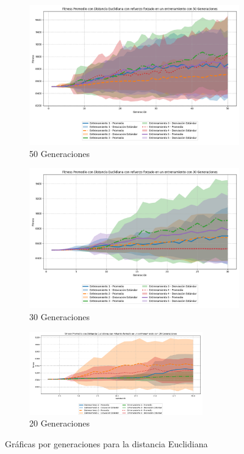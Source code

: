 \documentclass[conference]{IEEEtran}
\begin{document}
\begin{figure}[ht]
    \centering
    \begin{subfigure}{0.3\textwidth}
        \centering
        \includegraphics[width=\textwidth]{Euclidiana/Fitness_Acumulado_Eucli_50Gen.png}
        \caption{50 Generaciones}
        \label{fig:eucli_50gen}
    \end{subfigure}
    \hfill
    \begin{subfigure}{0.3\textwidth}
        \centering
        \includegraphics[width=\textwidth]{Euclidiana/Fitness_Acumulado_Eucli_30Gen.png}
        \caption{30 Generaciones}
        \label{fig:eucli_30gen}
    \end{subfigure}
    \hfill
    \begin{subfigure}{0.3\textwidth}
        \centering
        \includegraphics[width=\textwidth, height=3.6cm]{Euclidiana/Fitness_Acumulado_Eucli_20Gen.png}
        \caption{20 Generaciones}
        \label{fig:eucli_20gen}
    \end{subfigure}
	\caption{Gráficas por generaciones para la distancia Euclidiana}
    \label{fig:graficas_generales_euclidiana}
\end{figure}
\end{document}
